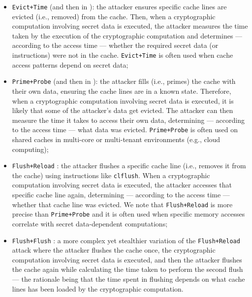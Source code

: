 \begin{itemize}
	\begin{itemize}
		
		\item \texttt{Evict+Time} \cite{hutchison_cache_2006} (and then in \cite{tromer_efficient_2010}): the attacker ensures specific cache lines are evicted (i.e., removed) from the cache. Then, when a cryptographic computation involving secret data is executed, the attacker measures the time taken by the execution of the cryptographic computation and determines --- according to the access time --- whether the required secret data (or instructions) were not in the cache. \texttt{Evict+Time} is often used when cache access patterns depend on secret data;
		
		\item \texttt{Prime+Probe} \cite{hutchison_cache_2006} (and then in \cite{tromer_efficient_2010}): the attacker fills (i.e., primes) the cache with their own data, ensuring the cache lines are in a known state. Therefore, when a cryptographic computation involving secret data is executed, it is likely that some of the attacker's data get evicted. The attacker can then measure the time it takes to access their own data, determining --- according to the access time --- what data was evicted. \texttt{Prime+Probe} is often used on shared caches in multi-core or multi-tenant environments (e.g., cloud computing);
		
		\item \texttt{Flush+Reload} \cite{yarom_flush_2014,stavrou_wait_2014}: the attacker flushes a specific cache line (i.e., removes it from the cache) using instructions like \texttt{clflush}. When a cryptographic computation involving secret data is executed, the attacker accesses that specific cache line again, determining --- according to the access time --- whether that cache line was evicted. We note that \texttt{Flush+Reload} is more precise than \texttt{Prime+Probe} and it is often used when specific memory accesses correlate with secret data-dependent computations;
		
		\item \texttt{Flush+Flush} \cite{gruss_flushflush_2016}: a more complex yet stealthier variation of the \texttt{Flush+Reload} attack where the attacker flushes the cache once, the cryptographic computation involving secret data is executed, and then the attacker flushes the cache again while calculating the time taken to perform the second flush --- the rationale being that the time spent in flushing depends on what cache lines has been loaded by the cryptographic computation.
				
	\end{itemize}
\end{itemize}

